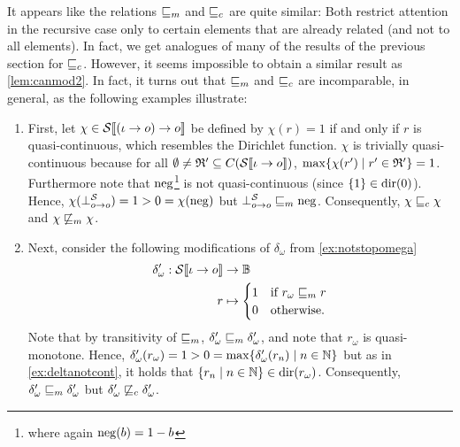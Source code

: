 \documentclass[a4paper,twoside,notitlepage,openright,11pt]{report}
\begin{document}
It appears like the relations $\sqsubseteq_m$ and $\sqsubseteq_c$ are quite similar: Both restrict attention in the recursive case only to certain elements that are already related (and not to all elements). In fact, we get analogues of many of the results of the previous section for $\sqsubseteq_c$. However, it seems impossible to obtain a similar result as \cref{lem:canmod2}. In fact, it turns out that $\sqsubseteq_m$ and $\sqsubseteq_c$ are incomparable, in general, as the following examples illustrate:
\begin{example}
  \begin{enumerate}
  \item First, let $\chi\in{\mathcal S}\llbracket(\iota\to o)\to o\rrbracket$ be defined by $\chi(r)=1$ if and only if $r$ is quasi-continuous, which resembles the Dirichlet function. $\chi$ is trivially quasi-continuous because for all $\emptyset\neq\mathfrak R'\subseteq C({\mathcal S}\llbracket\iota\to o\rrbracket)$, $\max\{\chi(r')\mid r'\in\mathfrak R'\}=1$. 
    Furthermore note that $\operatorname{neg}$\footnote{where again $\operatorname{neg}(b)=1-b$} is not quasi-continuous (since $\{1\}\in\operatorname{dir}(0)$).
    Hence, $\chi(\bot^\mathcal S_{o\to o})=1>0=\chi(\operatorname{neg})$ but $\bot^\mathcal S_{o\to o}\sqsubseteq_m\operatorname{neg}$. Consequently, $\chi\sqsubseteq_c\chi$ and $\chi\not\sqsubseteq_m\chi$.
  \item Next, consider the following modifications of $\delta_\omega$ from \cref{ex:notstopomega}
  \begin{align*}
    \delta'_\omega:{\mathcal S}\llbracket\iota\to o\rrbracket&\to\mathbb B\\
    r&\mapsto
       \begin{cases}
         1&\text{if }r_\omega\sqsubseteq_m r\\
         0&\text{otherwise.}
       \end{cases}
  \end{align*}
  Note that by transitivity of $\sqsubseteq_m$, $\delta'_\omega\sqsubseteq_m\delta'_\omega$, and note that $r_\omega$ is quasi-monotone. Hence, $\delta'_\omega(r_\omega)=1>0=\max\{\delta'_\omega(r_n)\mid n\in\mathbb N\}$ but as in \cref{ex:deltanotcont}, it holds that $\{r_n\mid n\in\mathbb N\}\in\operatorname{dir}(r_\omega)$. Consequently,  $\delta'_\omega\sqsubseteq_m\delta'_\omega$ but $\delta'_\omega\not\sqsubseteq_c\delta'_\omega$.
  \end{enumerate}
\end{example}
\end{document}
